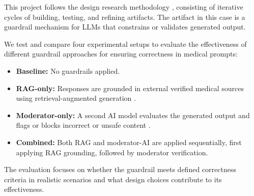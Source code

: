 %

This project follows the design research methodology \citep{wieringa2014design}, consisting of iterative cycles of building, testing, and refining artifacts.
The artifact in this case is a guardrail mechanism for LLMs that constrains or validates generated output.

We test and compare four experimental setups to evaluate the effectiveness of different guardrail approaches for ensuring correctness in medical prompts:

\begin{itemize}
    \item \textbf{Baseline:} No guardrails applied.
    \item \textbf{RAG-only:} Responses are grounded in external verified medical sources using retrieval-augmented generation \citep{dong2024guardrails}.
    \item \textbf{Moderator-only:} A second AI model evaluates the generated output and flags or blocks incorrect or unsafe content \citep{inan2023llamaguard}.
    \item \textbf{Combined:} Both RAG and moderator-AI are applied sequentially, first applying RAG grounding, followed by moderator verification.
\end{itemize}

The evaluation focuses on whether the guardrail meets defined correctness criteria in realistic scenarios and what design choices contribute to its effectiveness.

